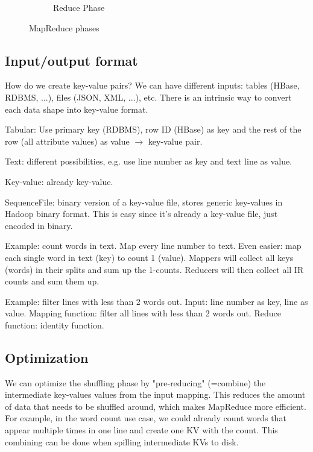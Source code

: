 \documentclass[11pt,oneside,a4paper]{article}
\begin{document}
\begin{figure}[t!]
\begin{subfigure}[t]{.3\textwidth}
		\caption{Reduce Phase}
		\label{fig:mrreducephase}
	\end{subfigure}
	\caption{MapReduce phases}
\end{figure}

\subsection{Input/output format}

How do we create key-value pairs? We can have different inputs: tables (HBase, RDBMS, ...), files (JSON, XML, ...), etc. There is an intrinsic way to convert each data shape into key-value format.

\begin{compactitem}
\item Tabular: Use primary key (RDBMS), row ID (HBase) as key and the rest of the row (all attribute values) as value $\rightarrow$ key-value pair.
\item Text: different possibilities, e.g. use line number as key and text line as value.
\item Key-value: already key-value.
\item SequenceFile: binary version of a key-value file, stores generic key-values in Hadoop binary format. This is easy since it's already a key-value file, just encoded in binary.
\end{compactitem}

Example: count words in text. Map every line number to text. Even easier: map each single word in text (key) to count 1 (value). Mappers will collect all keys (words) in their splits and sum up the 1-counts. Reducers will then collect all IR counts and sum them up.

Example: filter lines with less than 2 words out. Input: line number as key, line as value. Mapping function: filter all lines with less than 2 words out. Reduce function: identity function.


\subsection{Optimization}

We can optimize the shuffling phase by "pre-reducing" (=combine) the intermediate key-values values from the input mapping. This reduces the amount of data that needs to be shuffled around, which makes MapReduce more efficient. For example, in the word count use case, we could already count words that appear multiple times in one line and create one KV with the count. This combining can be done when spilling intermediate KVs to disk.
\end{document}
